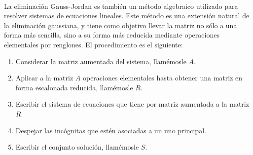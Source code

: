 \begin{adjustwidth}{-7.6cm}{-2cm}
    \begin{tcolorbox}[
        theorem style=change break,
        enhanced,
        breakable,
        boxrule=0pt,
        frame hidden,
        left = 1.8cm,
        right = 1.8cm,
        top=4mm,
        bottom=2mm,
        colback=black!7!white,
        coltitle=black,
        attach title to upper={\ },
        sharp corners,
        borderline north={1.5pt}{0pt}{black},
        title = {Método de eliminación Gauss-Jordan:},
        fonttitle=\selectfont\Lato\bfseries\LARGE,
        fontupper=\normalsize
    ]
        \,\\[4mm]
        La eliminación Gauss-Jordan es también un método algebraico utilizado para resolver sistemas de ecuaciones lineales. Este método es una extensión natural de la eliminación gaussiana, y tiene como objetivo llevar la matriz no sólo a una forma más sencilla, sino a su forma más reducida mediante operaciones elementales por renglones. El procedimiento es el siguiente:\vspace{0.3cm}
        \begin{enumerate}
            \item Considerar la matriz aumentada del sistema, llamémosle $A$.
            \item Aplicar a la matriz $A$ operaciones elementales hasta obtener una matriz en forma escalonada reducida, llamémosle $R$.
            \item Escribir el sistema de ecuaciones que tiene por matriz aumentada a la matriz $R$.
            \item Despejar las incógnitas que estén asociadas a un uno principal.
            \item Escribir el conjunto solución, llamémosle $S$.
        \end{enumerate}
    \end{tcolorbox}
\end{adjustwidth}

